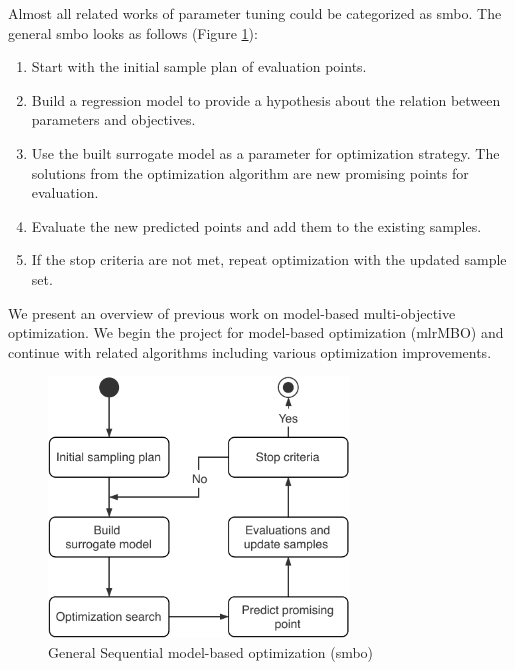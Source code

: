        Almost all related works of parameter tuning could be categorized as \gls{smbo}\cite{JonesSW98}.
        The general \gls{smbo} looks as follows (Figure \ref{fig:sequential_mbo}):
        \begin{enumerate}
            \item Start with the initial sample plan of evaluation points.
            \item Build a regression model to provide a hypothesis about the relation between parameters and objectives.
            \item Use the built surrogate model as a parameter for optimization strategy. The solutions from the optimization algorithm are new promising points for evaluation.
            \item Evaluate the new predicted points and add them to the existing samples.
            \item If the stop criteria are not met, repeat optimization with the updated sample set.
        \end{enumerate}
        We present an overview of previous work on model-based multi-objective optimization. We begin the project for model-based optimization (mlrMBO) and continue with related algorithms including various optimization improvements.
                                                                                                    
        \begin{figure}
            \centering 
            \includegraphics[width=8cm]{content/images/utility/sequential_mbo}
            \caption[General Sequential model-based optimization]{General Sequential model-based optimization (\Gls{smbo})} 
            \label{fig:sequential_mbo} 
        \end{figure}


